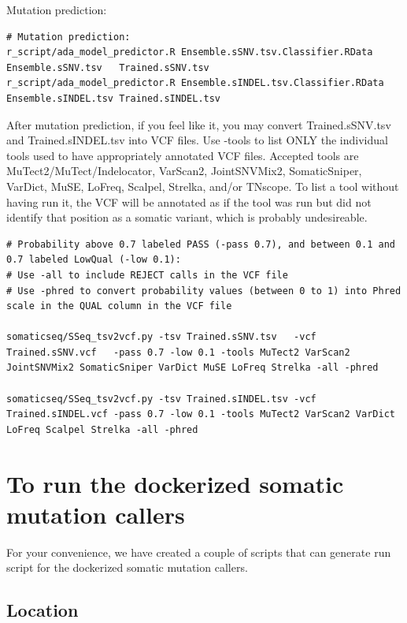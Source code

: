 \documentclass[10pt,letterpaper]{article}
\begin{document}
\begin{sloppypar}
Mutation prediction:
	
\begin{lstlisting}
# Mutation prediction:
r_script/ada_model_predictor.R Ensemble.sSNV.tsv.Classifier.RData   Ensemble.sSNV.tsv   Trained.sSNV.tsv
r_script/ada_model_predictor.R Ensemble.sINDEL.tsv.Classifier.RData Ensemble.sINDEL.tsv Trained.sINDEL.tsv
\end{lstlisting}

	
After mutation prediction, if you feel like it, you may convert Trained.sSNV.tsv and Trained.sINDEL.tsv into VCF files. Use -tools to list ONLY the individual tools used to have appropriately annotated VCF files. Accepted tools are MuTect2/MuTect/Indelocator, VarScan2, JointSNVMix2, SomaticSniper, VarDict, MuSE, LoFreq, Scalpel, Strelka, and/or TNscope. To list a tool without having run it, the VCF will be annotated as if the tool was run but did not identify that position as a somatic variant, which is probably undesireable. 


\begin{lstlisting}
# Probability above 0.7 labeled PASS (-pass 0.7), and between 0.1 and 0.7 labeled LowQual (-low 0.1):
# Use -all to include REJECT calls in the VCF file
# Use -phred to convert probability values (between 0 to 1) into Phred scale in the QUAL column in the VCF file

somaticseq/SSeq_tsv2vcf.py -tsv Trained.sSNV.tsv   -vcf Trained.sSNV.vcf   -pass 0.7 -low 0.1 -tools MuTect2 VarScan2 JointSNVMix2 SomaticSniper VarDict MuSE LoFreq Strelka -all -phred

somaticseq/SSeq_tsv2vcf.py -tsv Trained.sINDEL.tsv -vcf Trained.sINDEL.vcf -pass 0.7 -low 0.1 -tools MuTect2 VarScan2 VarDict LoFreq Scalpel Strelka -all -phred
\end{lstlisting}



\section{To run the dockerized somatic mutation callers} \label{dockerized_callers}

For your convenience, we have created a couple of scripts that can generate run script for the dockerized somatic mutation callers. 

\subsection{Location}


\end{sloppypar}
\end{document}
